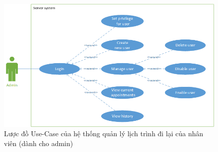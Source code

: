 \documentclass[a4paper]{article}
\begin{document}
\begin{figure}[!h]
    \includegraphics[scale=0.7]{UsecaseDiagram/UseCaseDiagramServerTTTN}
    \centering
    \caption{Lược đồ Use-Case của hệ thống quản lý lịch trình đi lại của nhân viên (dành cho admin)}
    \label{fig:usecase_server}
\end{figure}
\end{document}
